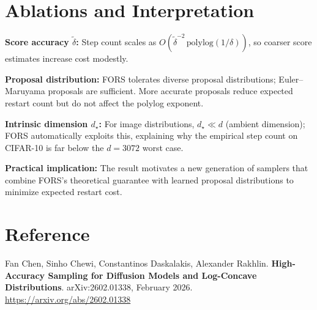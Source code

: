 \documentclass[10pt,twocolumn]{article}
\begin{document}
\section{Ablations and Interpretation}

\textbf{Score accuracy $\tilde{\delta}$:} Step count scales as
$O(\tilde{\delta}^{-2}\,\mathrm{polylog}(1/\delta))$, so coarser score
estimates increase cost modestly.

\textbf{Proposal distribution:} FORS tolerates diverse proposal distributions;
Euler--Maruyama proposals are sufficient. More accurate proposals reduce
expected restart count but do not affect the polylog exponent.

\textbf{Intrinsic dimension $d_\star$:} For image distributions, $d_\star \ll d$
(ambient dimension); FORS automatically exploits this, explaining why
the empirical step count on CIFAR-10 is far below the $d = 3072$ worst case.

\textbf{Practical implication:} The result motivates a new generation of
samplers that combine FORS's theoretical guarantee with learned proposal
distributions to minimize expected restart cost.

\section*{Reference}

Fan Chen, Sinho Chewi, Constantinos Daskalakis, Alexander Rakhlin.
\textbf{High-Accuracy Sampling for Diffusion Models and Log-Concave Distributions}.
arXiv:2602.01338, February 2026.
\url{https://arxiv.org/abs/2602.01338}
\end{document}
